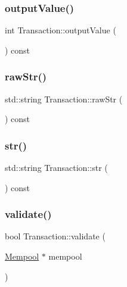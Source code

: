 \mbox{\label{classTransaction_a1feb6131c4b683d6c59073dbf754a634}} 
\subsubsection{\texorpdfstring{output\+Value()}{outputValue()}}
{\footnotesize\ttfamily int Transaction\+::output\+Value (\begin{DoxyParamCaption}{ }\end{DoxyParamCaption}) const}

\mbox{\label{classTransaction_a90b3668de562cc1b7f5773e72ac9f6dc}} 
\subsubsection{\texorpdfstring{raw\+Str()}{rawStr()}}
{\footnotesize\ttfamily std\+::string Transaction\+::raw\+Str (\begin{DoxyParamCaption}{ }\end{DoxyParamCaption}) const}

\mbox{\label{classTransaction_accf9cca56688761bdb9518c3f1b90ed5}} 
\subsubsection{\texorpdfstring{str()}{str()}}
{\footnotesize\ttfamily std\+::string Transaction\+::str (\begin{DoxyParamCaption}{ }\end{DoxyParamCaption}) const}

\mbox{\label{classTransaction_afc37b00566ba0dc72e8efa9dd471601d}} 
\subsubsection{\texorpdfstring{validate()}{validate()}}
{\footnotesize\ttfamily bool Transaction\+::validate (\begin{DoxyParamCaption}\item[{\mbox{\hyperlink{classMempool}{Mempool}} $\ast$}]{mempool }\end{DoxyParamCaption})}


